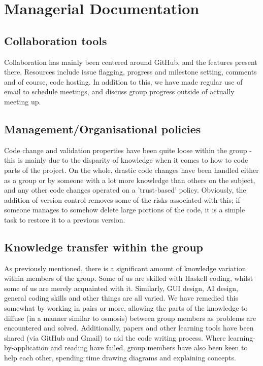 \documentclass[11pt]{article}
\begin{document}
\section{Managerial Documentation}

\subsection{Collaboration tools}
Collaboration has mainly been centered around GitHub, and the features present
there. Resources include issue flagging, progress and milestone setting, comments 
and of course, code hosting. In addition to this, we have made regular use of 
email to schedule meetings, and discuss group progress outside of actually 
meeting up.

\subsection{Management/Organisational policies}
Code change and validation properties have been quite loose within the group - 
this is mainly due to the disparity of knowledge when it comes to how to code 
parts of the project. On the whole, drastic code changes have been handled 
either as a group or by someone with a lot more knowledge than others on the 
subject, and any other code changes operated on a 'trust-based' policy. 
Obviously, the addition of version control removes some of the risks associated
with this; if someone manages to somehow delete large portions of the code, it
is a simple task to restore it to a previous version.

\subsection{Knowledge transfer within the group}
As previously mentioned, there is a significant amount of knowledge variation
within members of the group. Some of us are skilled with Haskell coding, whilst
some of us are merely acquainted with it. Similarly, GUI design, AI design,
general coding skills and other things are all varied. We have remedied this 
somewhat by working in pairs or more, allowing the parts of the knowledge to 
diffuse (in a manner similar to osmosis) between group members as problems are
encountered and solved. Additionally, papers and other learning tools have been
shared (via GitHub and Gmail) to aid the code writing process. Where 
learning-by-application and reading have failed, group members have also been
keen to help each other, spending time drawing diagrams and explaining concepts.
\end{document}

